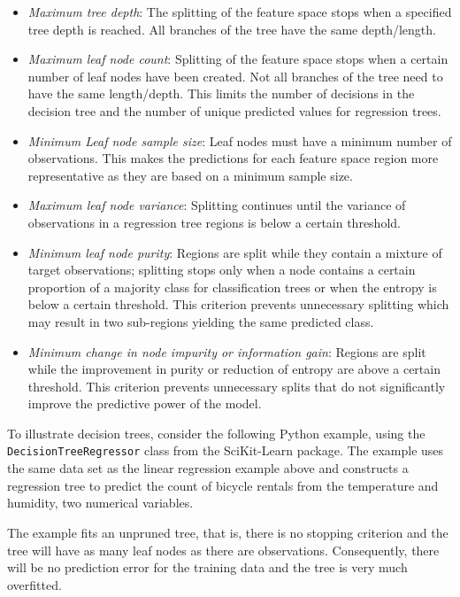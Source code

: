 \begin{itemize}
  \item \emph{Maximum tree depth}: The splitting of the feature space stops when a specified tree depth is reached. All branches of the tree have the same depth/length. 
  \item \emph{Maximum leaf node count}: Splitting of the feature space stops when a certain number of leaf nodes have been created. Not all branches of the tree need to have the same length/depth. This limits the number of decisions in the decision tree and the number of unique predicted values for regression trees.
  \item \emph{Minimum Leaf node sample size}: Leaf nodes must have a minimum number of observations. This makes the predictions for each feature space region more representative as they are based on a minimum sample size.
  \item \emph{Maximum leaf node variance}: Splitting continues until the variance of observations in a regression tree regions is below a certain threshold. 
  \item \emph{Minimum leaf node purity}: Regions are split while they contain a mixture of target observations; splitting stops only when a node contains a certain proportion of a majority class for classification trees or when the entropy is below a certain threshold. This criterion prevents unnecessary splitting which may result in two sub-regions yielding the same predicted class. 
  \item \emph{Minimum change in node impurity or information gain}: Regions are split while the improvement in purity or reduction of entropy are above a certain threshold. This criterion prevents unnecessary splits that do not significantly improve the predictive power of the model. 
\end{itemize}

To illustrate decision trees, consider the following Python example, using the \\ \texttt{DecisionTreeRegressor} class from the SciKit-Learn package. The example uses the same data set as the linear regression example above and constructs a regression tree to predict the count of bicycle rentals from the temperature and humidity, two numerical variables. 

The example fits an unpruned tree, that is, there is no stopping criterion and the tree will have as many leaf nodes as there are observations. Consequently, there will be no prediction error for the training data and the tree is very much overfitted.

